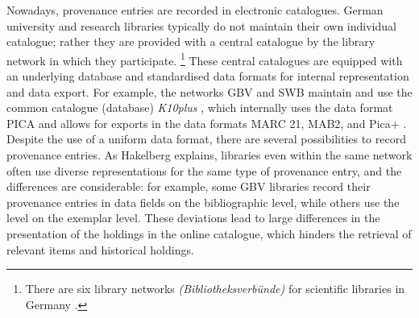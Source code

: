 Nowadays, provenance entries are recorded in electronic catalogues.
German university and research libraries typically do not 
maintain their own individual catalogue; rather they are provided with a central
catalogue by the library network in which they participate.%
\footnote{%
  There are six library networks \emph{(Bibliotheksverbünde)} for scientific libraries
  in Germany %
  \autocite{WikiBibliotheksverbundDeutschland}.
}
These central catalogues are equipped with an underlying database
and standardised data formats for internal representation and data export.
For example, the networks GBV and SWB maintain and use the common catalogue (database)
\emph{K10plus} \autocite{K10plus},
which internally uses the data format PICA \autocite{PICA}
and allows for exports in the data formats
MARC 21, MAB2, and Pica+ \autocite{K10plusExportformate}.
Despite the use of a uniform data format,
there are several possibilities to record provenance entries.
As Hakelberg \autocite*[Chapter~4]{Hakelberg2016} explains,
libraries even within the same network often use diverse representations
for the same type of provenance entry, and the differences are considerable:
for example, some GBV libraries record their provenance entries
in data fields on the bibliographic level,
while others use the level on the exemplar level.
These deviations lead to large differences in the presentation
of the holdings in the online catalogue,
which hinders the retrieval of relevant items and historical holdings.

